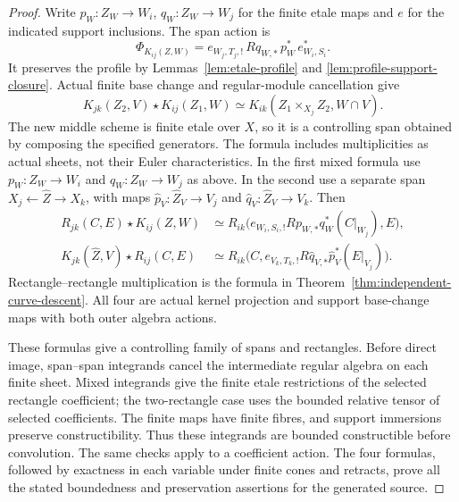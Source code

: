 \documentclass[11pt]{article}
\theoremstyle{definition}
\theoremstyle{remark}
\begin{document}
\begin{proof}
Write $p_W:Z_W\to W_i$, $q_W:Z_W\to W_j$ for the finite etale
maps and $e$ for the indicated support inclusions. The span action is
\[
 \Phi_{K_{ij}(Z,W)}=
 e_{W_j,T_j,!}\,Rq_{W,*}\,p_W^*\,e_{W_i,S_i}^*.
\]
It preserves the profile by Lemmas~\ref{lem:etale-profile} and
\ref{lem:profile-support-closure}. Actual finite base change and
regular-module cancellation give
\[
 K_{jk}(Z_2,V)\star K_{ij}(Z_1,W)
 \simeq K_{ik}(Z_1\times_{X_j}Z_2,W\cap V).
\]
The new middle scheme is finite etale over $X$, so it is a
controlling span obtained by composing the specified generators.
The formula includes multiplicities as actual sheets,
not their Euler characteristics. In the first mixed formula use
$p_W:Z_W\to W_i$ and $q_W:Z_W\to W_j$ as above. In the second
use a separate span $X_j\leftarrow\widehat Z\to X_k$, with maps
$\widehat p_V:\widehat Z_V\to V_j$ and
$\widehat q_V:\widehat Z_V\to V_k$. Then
\[
 \begin{aligned}
 R_{jk}(C,E)\star K_{ij}(Z,W)
  &\simeq R_{ik}\bigl(e_{W_i,S_i,!}Rp_{W,*}q_W^*(C|_{W_j}),E\bigr),\\
 K_{jk}(\widehat Z,V)\star R_{ij}(C,E)
  &\simeq R_{ik}\bigl(C,e_{V_k,T_k,!}
       R\widehat q_{V,*}\widehat p_V^*(E|_{V_j})\bigr).
 \end{aligned}
\]
Rectangle--rectangle multiplication is the formula in
Theorem~\ref{thm:independent-curve-descent}.
All four are actual kernel projection and support base-change maps
with both outer algebra actions.

These formulas give a controlling family of spans and rectangles.
Before direct image, span--span integrands cancel the intermediate
regular algebra on each finite sheet. Mixed integrands give the
finite etale restrictions of the selected rectangle coefficient;
the two-rectangle case uses the bounded relative tensor of selected
coefficients. The finite maps have finite fibres, and support
immersions preserve constructibility. Thus these integrands are
bounded constructible before convolution. The same checks apply to
a coefficient action. The four formulas, followed by exactness in
each variable under finite cones and retracts, prove all the stated
boundedness and preservation assertions for the generated source.


\end{proof}
\end{document}
